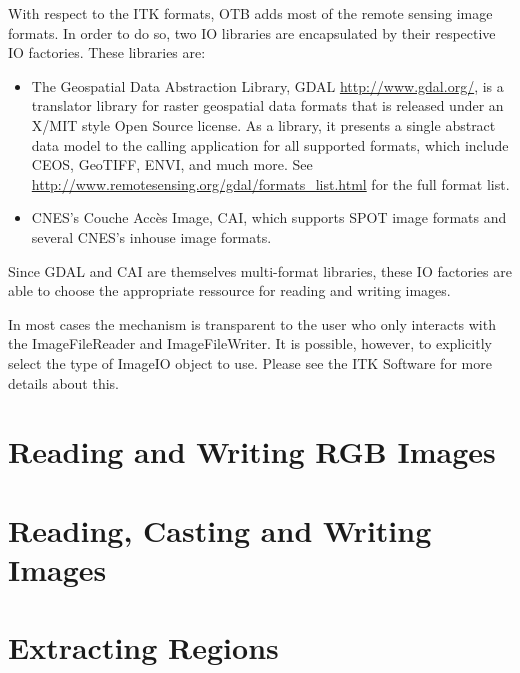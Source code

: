 With respect to the ITK formats, OTB adds most of the remote sensing
image formats. In order to do so, two IO libraries are encapsulated by
their respective IO factories. These libraries are:
\begin{itemize}
  \item The Geospatial Data Abstraction Library, GDAL
      \url{http://www.gdal.org/}, is a translator library for raster
      geospatial data formats that is released under an X/MIT style
      Open Source license. As a library, it presents a single abstract
      data model to the calling application for all supported formats,
      which include CEOS, GeoTIFF, ENVI, and much more. See
      \url{http://www.remotesensing.org/gdal/formats_list.html} for
      the full format list.
    \item CNES's Couche Acc\`es Image, CAI, which supports SPOT image
    formats and several CNES's inhouse image formats.
\end{itemize}

Since GDAL and CAI are themselves multi-format libraries, these IO
factories are able to choose the appropriate ressource for reading and
writing images. 

In most cases the mechanism is transparent to the user who only interacts
with the ImageFileReader and ImageFileWriter. It is
possible, however, to explicitly select the type of ImageIO object
to use.  Please see the ITK Software for more details about this.

%


\section{Reading and Writing RGB Images}
\label{sec:RGBImagReadWrite}


\section{Reading, Casting and Writing Images}
\label{sec:ImagReadCastWrite}


\section{Extracting Regions}
\label{sec:ImagReadRegionOfInterestWrite}


